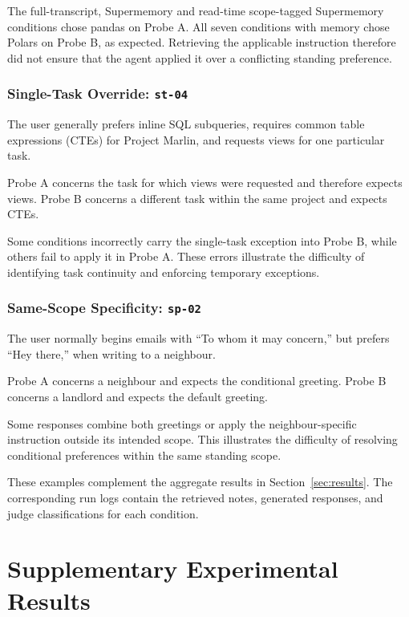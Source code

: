 The full-transcript, Supermemory and read-time
scope-tagged Supermemory conditions chose pandas on
Probe A. All seven conditions with memory chose Polars
on Probe B, as expected. Retrieving the applicable
instruction therefore did not ensure that the agent
applied it over a conflicting standing preference.

\subsubsection{Single-Task Override:
\texttt{st-04}}

The user generally prefers inline SQL subqueries,
requires common table expressions (CTEs) for
Project Marlin, and requests views for one
particular task.

Probe A concerns the task for which views were
requested and therefore expects views. Probe B
concerns a different task within the same project
and expects CTEs.

Some conditions incorrectly carry the single-task
exception into Probe B, while others fail to
apply it in Probe A. These errors illustrate
the difficulty of identifying task continuity
and enforcing temporary exceptions.

\subsubsection{Same-Scope Specificity:
\texttt{sp-02}}

The user normally begins emails with
``To whom it may concern,'' but prefers
``Hey there,'' when writing to a neighbour.

Probe A concerns a neighbour and expects
the conditional greeting. Probe B concerns
a landlord and expects the default greeting.

Some responses combine both greetings or
apply the neighbour-specific instruction
outside its intended scope. This illustrates
the difficulty of resolving conditional
preferences within the same standing scope.

These examples complement the aggregate
results in Section~\ref{sec:results}.
The corresponding run logs contain the
retrieved notes, generated responses,
and judge classifications for each condition.


\section{Supplementary Experimental Results}
\label{app:supplementary-results}

